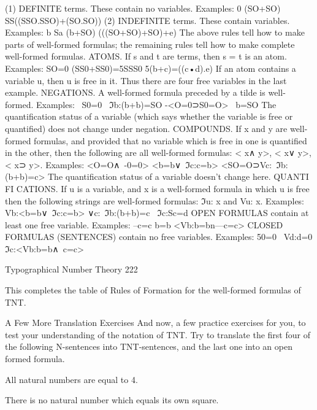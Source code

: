                  (1) DEFINITE terms. These contain no variables.
                     Examples: 0 (SO+SO) SS((SSO.SSO)+(SO.SO))
                 (2) INDEFINITE terms. These contain variables.
                    Examples: b Sa (b+SO) (((SO+SO)+SO)+e)
        The above rules tell how to make parts of well-formed formulas; the remaining
rules tell how to make complete well-formed formulas.
ATOMS.
         If s and t are terms, then s = t is an atom.
         Examples: SO=0 (SS0+SS0)=5SSS0 5(b+c)=((c•d).e)
         If an atom contains a variable u, then u is free in it. Thus there are
         four free variables in the last example.
NEGATIONS.
         A well-formed formula preceded by a tilde is well-formed.
         Examples: ~S0=0 ~ℑb:(b+b)=SO -<O=0⊃S0=O> ~b=SO
         The quantification status of a variable (which says whether the variable is
                free or quantified) does not change under negation.
COMPOUNDS.
         If x and y are well-formed formulas, and provided that no variable which is free in
         one is quantified in the other, then the following are all well-formed formulas:
         < x∧ y>, < x∨ y>, < x⊃ y>.
         Examples: <O=O∧~-0=0> <b=b∨~ℑc:c=b>
         <SO=O⊃Vc:~ℑb:(b+b)=c>
         The quantification status of a variable doesn't change here.
QUANTI FI CATIONS.
       If u is a variable, and x is a well-formed formula in which u is free then the
following strings are well-formed formulas:
         ℑu: x and Vu: x.
         Examples: Vb:<b=b∨~ℑc:c=b>           ∨c:~ℑb:(b+b)=c ~ℑc:Sc=d
OPEN FORMULAS contain at least one free variable.
         Examples: --c=c b=b <Vb:b=bn---c=c>
CLOSED FORMULAS (SENTENCES) contain no free variables.
         Examples: 50=0     ~Vd:d=0      ℑc:<Vb:b=b∧~c=c>




Typographical Number Theory                                                                222

This completes the table of Rules of Formation for the well-formed formulas of TNT.

                        A Few More Translation Exercises
And now, a few practice exercises for you, to test your understanding of the notation of
TNT. Try to translate the first four of the following N-sentences into TNT-sentences, and
the last one into an open formed formula.

                                All natural numbers are equal to 4.

                     There is no natural number which equals its own square.

